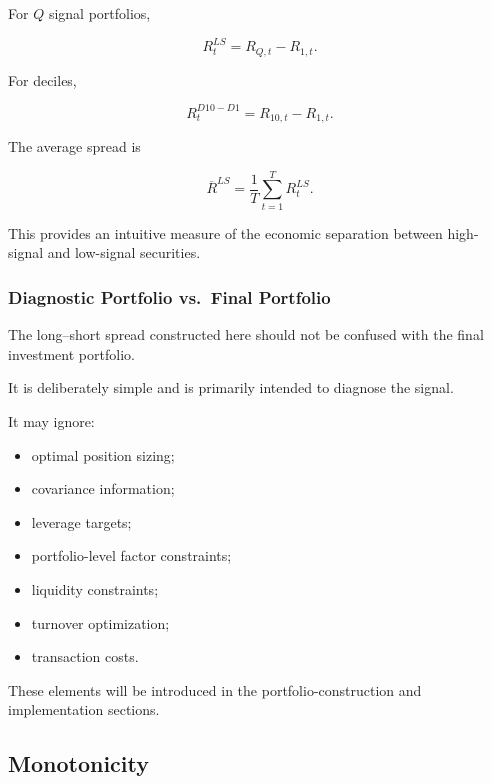\documentclass[11pt,a4paper]{article}
\begin{document}
For $Q$ signal portfolios,

\begin{equation}
\boxed{
R_{t}^{LS}
=
R_{Q,t}
-
R_{1,t}.
}
\end{equation}

For deciles,

\begin{equation}
R_t^{D10-D1}
=
R_{10,t}
-
R_{1,t}.
\end{equation}

The average spread is

\begin{equation}
\boxed{
\overline{R}^{LS}
=
\frac{1}{T}
\sum_{t=1}^{T}
R_t^{LS}.
}
\end{equation}

This provides an intuitive measure of the economic separation between
high-signal and low-signal securities.


\subsubsection{Diagnostic Portfolio vs.\ Final Portfolio}

The long--short spread constructed here should not be confused with the final
investment portfolio.

It is deliberately simple and is primarily intended to diagnose the signal.

It may ignore:

\begin{itemize}
    \item optimal position sizing;
    \item covariance information;
    \item leverage targets;
    \item portfolio-level factor constraints;
    \item liquidity constraints;
    \item turnover optimization;
    \item transaction costs.
\end{itemize}

These elements will be introduced in the portfolio-construction and
implementation sections.


\subsection{Monotonicity}
\label{subsec:signal_monotonicity}
\end{document}
